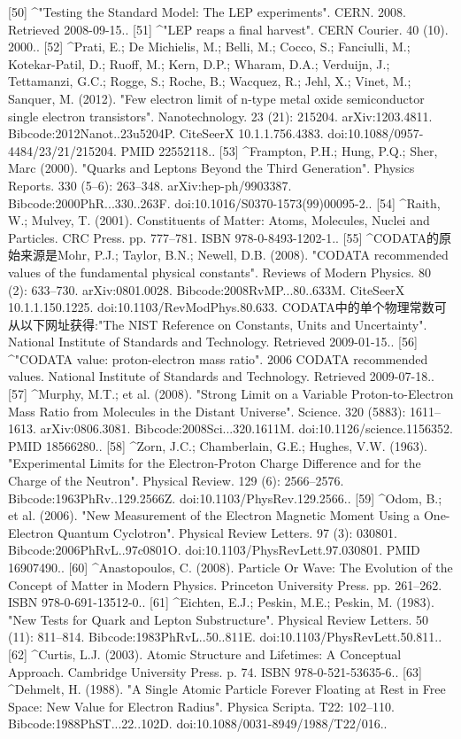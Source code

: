 [50]
^"Testing the Standard Model: The LEP experiments". CERN. 2008. Retrieved 2008-09-15..
[51]
^"LEP reaps a final harvest". CERN Courier. 40 (10). 2000..
[52]
^Prati, E.; De Michielis, M.; Belli, M.; Cocco, S.; Fanciulli, M.; Kotekar-Patil, D.; Ruoff, M.; Kern, D.P.; Wharam, D.A.; Verduijn, J.; Tettamanzi, G.C.; Rogge, S.; Roche, B.; Wacquez, R.; Jehl, X.; Vinet, M.; Sanquer, M. (2012). "Few electron limit of n-type metal oxide semiconductor single electron transistors". Nanotechnology. 23 (21): 215204. arXiv:1203.4811. Bibcode:2012Nanot..23u5204P. CiteSeerX 10.1.1.756.4383. doi:10.1088/0957-4484/23/21/215204. PMID 22552118..
[53]
^Frampton, P.H.; Hung, P.Q.; Sher, Marc (2000). "Quarks and Leptons Beyond the Third Generation". Physics Reports. 330 (5–6): 263–348. arXiv:hep-ph/9903387. Bibcode:2000PhR...330..263F. doi:10.1016/S0370-1573(99)00095-2..
[54]
^Raith, W.; Mulvey, T. (2001). Constituents of Matter: Atoms, Molecules, Nuclei and Particles. CRC Press. pp. 777–781. ISBN 978-0-8493-1202-1..
[55]
^CODATA的原始来源是Mohr, P.J.; Taylor, B.N.; Newell, D.B. (2008). "CODATA recommended values of the fundamental physical constants". Reviews of Modern Physics. 80 (2): 633–730. arXiv:0801.0028. Bibcode:2008RvMP...80..633M. CiteSeerX 10.1.1.150.1225. doi:10.1103/RevModPhys.80.633. CODATA中的单个物理常数可从以下网址获得:"The NIST Reference on Constants, Units and Uncertainty". National Institute of Standards and Technology. Retrieved 2009-01-15..
[56]
^"CODATA value: proton-electron mass ratio". 2006 CODATA recommended values. National Institute of Standards and Technology. Retrieved 2009-07-18..
[57]
^Murphy, M.T.; et al. (2008). "Strong Limit on a Variable Proton-to-Electron Mass Ratio from Molecules in the Distant Universe". Science. 320 (5883): 1611–1613. arXiv:0806.3081. Bibcode:2008Sci...320.1611M. doi:10.1126/science.1156352. PMID 18566280..
[58]
^Zorn, J.C.; Chamberlain, G.E.; Hughes, V.W. (1963). "Experimental Limits for the Electron-Proton Charge Difference and for the Charge of the Neutron". Physical Review. 129 (6): 2566–2576. Bibcode:1963PhRv..129.2566Z. doi:10.1103/PhysRev.129.2566..
[59]
^Odom, B.; et al. (2006). "New Measurement of the Electron Magnetic Moment Using a One-Electron Quantum Cyclotron". Physical Review Letters. 97 (3): 030801. Bibcode:2006PhRvL..97c0801O. doi:10.1103/PhysRevLett.97.030801. PMID 16907490..
[60]
^Anastopoulos, C. (2008). Particle Or Wave: The Evolution of the Concept of Matter in Modern Physics. Princeton University Press. pp. 261–262. ISBN 978-0-691-13512-0..
[61]
^Eichten, E.J.; Peskin, M.E.; Peskin, M. (1983). "New Tests for Quark and Lepton Substructure". Physical Review Letters. 50 (11): 811–814. Bibcode:1983PhRvL..50..811E. doi:10.1103/PhysRevLett.50.811..
[62]
^Curtis, L.J. (2003). Atomic Structure and Lifetimes: A Conceptual Approach. Cambridge University Press. p. 74. ISBN 978-0-521-53635-6..
[63]
^Dehmelt, H. (1988). "A Single Atomic Particle Forever Floating at Rest in Free Space: New Value for Electron Radius". Physica Scripta. T22: 102–110. Bibcode:1988PhST...22..102D. doi:10.1088/0031-8949/1988/T22/016..

